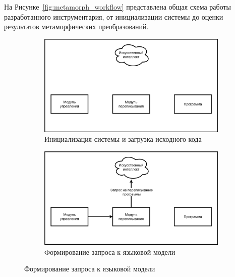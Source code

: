 На Рисунке~\ref{fig:metamorph_workflow} представлена общая схема работы разработанного инструментария, от инициализации системы до оценки результатов метаморфических преобразований.

\begin{figure}[ht!] %
    \centering %

    \begin{subfigure}[b]{0.5\textwidth} %
        \centering
        \includegraphics[width=\textwidth]{images/METAMORPHLLM0.png} %
        \caption{Инициализация системы и загрузка исходного кода}
        \label{fig:photo_221_1}
    \end{subfigure}%
    \hfill %
    \begin{subfigure}[b]{0.5\textwidth}
        \centering
        \includegraphics[width=\textwidth]{images/METAMORPHLLM1.png} %
        \caption{Формирование запроса к языковой модели}
        \label{fig:photo_221_2}
    \end{subfigure}


\end{figure}
